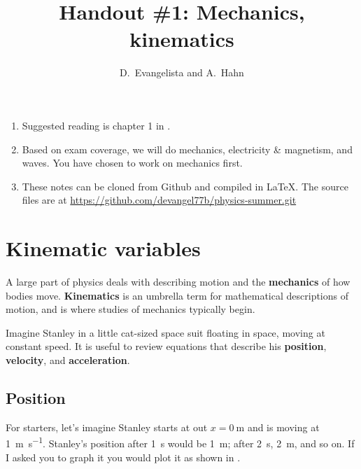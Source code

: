 \documentclass{tufte-handout}
\title{Handout \#1: Mechanics, kinematics}
\author{D.~Evangelista and A.~Hahn}
\date{\printdate{6/14/2021}}
\begin{document}
\maketitle
\begin{enumerate}
\item Suggested reading is chapter 1 in \citeauthor{kleppner2014introduction}\cite{kleppner2014introduction}. 
\item Based on exam coverage, we will do mechanics, electricity \& magnetism, and waves. You have chosen to work on mechanics first.
\item These notes can be cloned from Github and compiled in \LaTeX. The source files are at \url{https://github.com/devangel77b/physics-summer.git}
\end{enumerate}

\section{Kinematic variables}
A large part of physics deals with describing motion and the \textbf{mechanics} of how bodies move. \textbf{Kinematics} is an umbrella term for mathematical descriptions of motion, and is where studies of mechanics typically begin. 

Imagine Stanley in a little cat-sized space suit floating in space, moving at constant speed. It is useful to review equations that describe his \textbf{position}, \textbf{velocity}, and \textbf{acceleration}. 

\subsection{Position}
For starters, let's imagine Stanley starts at out $x=\SI{0}{\meter}$ and is moving at \SI{1}{\meter\per\second}. Stanley's position after \SI{1}{\second} would be \SI{1}{\meter}; after \SI{2}{\second}, \SI{2}{\meter}, and so on. If I asked you to graph it you would plot it as shown in .
\begin{marginfigure}
\caption{Stanley's position}
\label{fig:position}
\end{marginfigure}
\end{document}

